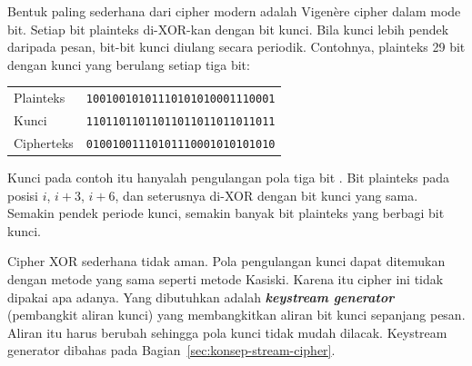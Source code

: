 Bentuk paling sederhana dari cipher modern adalah Vigen\`ere cipher dalam mode
bit. Setiap bit plainteks di-XOR-kan dengan bit kunci. Bila kunci lebih pendek
daripada pesan, bit-bit kunci diulang secara periodik. Contohnya, plainteks 29
bit dengan kunci yang berulang setiap tiga bit:
\begin{center}
\small
\begin{tabular}{@{}ll@{}}
Plainteks  & \texttt{10010010101110101010001110001} \\
Kunci      & \texttt{11011011011011011011011011011} \\
Cipherteks & \texttt{01001001110101110001010101010} \\
\end{tabular}
\end{center}

Kunci pada contoh itu hanyalah pengulangan pola tiga bit . Bit
plainteks pada posisi $i$, $i+3$, $i+6$, dan seterusnya di-XOR dengan bit kunci
yang sama. Semakin pendek periode kunci, semakin banyak bit plainteks yang
berbagi bit kunci.

Cipher XOR sederhana tidak aman. Pola pengulangan kunci dapat ditemukan dengan
metode yang sama seperti metode Kasiski. Karena itu cipher ini tidak dipakai
apa adanya. Yang dibutuhkan adalah \textbf{\textit{keystream generator}}
(pembangkit aliran kunci) yang membangkitkan aliran bit kunci sepanjang pesan. Aliran itu harus berubah
sehingga pola kunci tidak mudah dilacak. Keystream generator dibahas pada
Bagian~\ref{sec:konsep-stream-cipher}.
